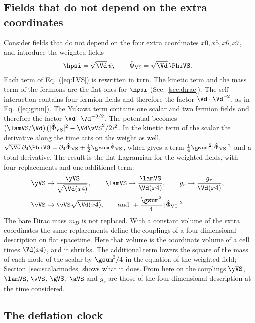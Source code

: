 \subsection{Fields that do not depend on the extra coordinates}

Consider fields that do not depend on the four extra coordinates
$x0,x5,x6,x7$, and introduce the weighted fields
\begin{equation}
\hpsi=\sqrt{\Vd}\,\psi,\qquad\hat\Phi_{\mathrm{VS}}=\sqrt{\Vd}\,\PhiVS .
\end{equation}
Each term of Eq.~(\ref{eq:LVS}) is rewritten in turn. The kinetic term and the mass term of the
fermions are the flat ones for $\hpsi$ (Sec.~\ref{sec:dirac}). The self-interaction contains four
fermion fields and therefore the factor $\Vd\cdot\Vd^{-2}$, as in Eq.~(\ref{eq:grun}). The Yukawa
term contains one scalar and two fermion fields
and therefore the factor $\Vd\cdot\Vd^{-3/2}$. The potential becomes
$(\lamVS/\Vd)\,(|\hat\Phi_{\mathrm{VS}}|^{2}-\Vd\vVS^{2}/2)^{2}$. In the kinetic term of the scalar the
derivative along the time acts on the weight as well,
$\sqrt{\Vd}\,\partial_4\PhiVS=\partial_4\hat\Phi_{\mathrm{VS}}+\tfrac12\gsum\,\hat\Phi_{\mathrm{VS}}$,
which gives a term $\tfrac14\gsum^{2}|\hat\Phi_{\mathrm{VS}}|^{2}$ and a total derivative. The result
is the flat Lagrangian for the weighted fields, with four replacements and one additional term:
\begin{equation}
\begin{aligned}
&\yVS\to\frac{\yVS}{\sqrt{\Vd(x4)}},\qquad\lamVS\to\frac{\lamVS}{\Vd(x4)},\qquad g_r\to\frac{g_r}{\Vd(x4)},\\
&\vVS\to\vVS\sqrt{\Vd(x4)},\qquad\text{and }+\frac{\gsum^{2}}{4}\,|\hat\Phi_{\mathrm{VS}}|^{2}.
\end{aligned}
\label{eq:couplings}
\end{equation}
The bare Dirac mass $m_D$ is not replaced. With a constant volume of the extra coordinates the same
replacements define the couplings of a four-dimensional description on flat spacetime. Here that
volume is the coordinate volume of a cell times $\Vd(x4)$, and it shrinks. The additional term lowers the square of
the mass of each mode of the scalar by $\gsum^{2}/4$ in the equation of the weighted field;
Section~\ref{sec:scalarmodes} shows what it does. From here on the couplings $\yVS$, $\lamVS$,
$\vVS$, $\gVS$, $\aVS$ and $g_r$ are those of the four-dimensional description at the time
considered.

\subsection{The deflation clock}


